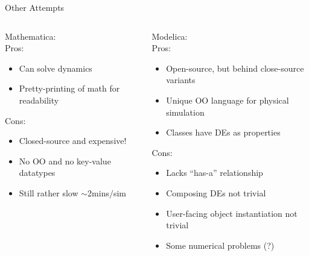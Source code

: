 \documentclass[mathserif]{beamer}
\begin{document}
\begin{frame}{Other Attempts}
  \begin{columns}
    \begin{column}{0.49\linewidth}
      Mathematica:\\
      Pros:
      \begin{itemize}
        \item Can solve dynamics
        \item Pretty-printing of math for readability
      \end{itemize}
      Cons:
      \begin{itemize}
        \item Closed-source and expensive!
        \item No OO and no key-value datatypes
        \item Still rather slow $\sim$2mins$/$sim
      \end{itemize}
    \end{column}
    \begin{column}{0.49\linewidth}
      Modelica:\\
      Pros:
      \begin{itemize}
        \item Open-source, but behind close-source variants
        \item Unique OO language for physical simulation
        \item Classes have DEs as properties
      \end{itemize}
      Cons:
      \begin{itemize}
        \item Lacks ``has-a'' relationship
        \item Composing DEs not trivial
        \item User-facing object instantiation not trivial
        \item Some numerical problems (?)
      \end{itemize}
    \end{column}
  \end{columns}
\end{frame}
\end{document}
